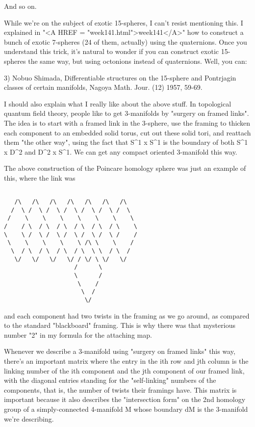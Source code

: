 And so on.  

While we're on the subject of exotic 15-spheres, I can't resist
mentioning this.  I explained in "<A HREF =
"week141.html">week141</A>" how to construct a bunch of exotic
7-spheres (24 of them, actually) using the quaternions.  Once you
understand this trick, it's natural to wonder if you can construct
exotic 15-spheres the same way, but using octonions instead of
quaternions.  Well, you can:

3) Nobuo Shimada, Differentiable structures on the 15-sphere and 
Pontrjagin classes of certain manifolds, Nagoya Math. Jour. (12) 1957, 59-69. 

I should also explain what I really like about the above stuff.  In
topological quantum field theory, people like to get 3-manifolds by
"surgery on framed links".  The idea is to start with a framed
link in the 3-sphere, use the framing to thicken each component to an
embedded solid torus, cut out these solid tori, and reattach them
"the other way", using the fact that S^{1} x
S^{1} is the boundary of both S^{1} x D^{2} and
D^{2} x S^{1}.  We can get any compact oriented
3-manifold this way.

The above construction of the Poincare homology sphere was just an
example of this, where the link was


\begin{verbatim}

   /\   /\   /\   /\   /\   /\   /\ 
  /  \ /  \ /  \ /  \ /  \ /  \ /  \
 /    \    \    \    \    \    \    \
/    / \  / \  / \  / \  / \  / \    \ 
\    \ /  \ /  \ /  \ /  \ /  \ /    / 
 \    \    \    \    \ /\ \    \    /
  \  / \  / \  / \  / \  \ \  / \  /
   \/   \/   \/   \/ / \/ \ \/   \/
                    /      \ 
                    \      /
                     \    /
                      \  /
                       \/ 
\end{verbatim}
    
and each component had two twists in the framing as we go around,
as compared to the standard "blackboard" framing.  This is why there 
was that mysterious number "2" in my formula for the attaching map.

Whenever we describe a 3-manifold using "surgery on framed
links" this way, there's an important matrix where the entry in the
ith row and jth column is the linking number of the ith component and
the jth component of our framed link, with the diagonal entries standing
for the "self-linking" numbers of the components, that is, the
number of twists their framings have.  This matrix is important because
it also describes the "intersection form" on the 2nd homology
group of a simply-connected 4-manifold M whose boundary dM is the
3-manifold we're describing.


